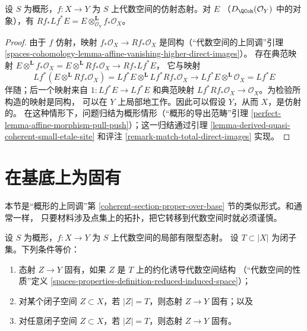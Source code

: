 \begin{lemma}
\label{lemma-affine-morphism-pull-push}
设 $S$ 为概形，$f : X \to Y$ 为 $S$ 上代数空间的仿射态射。对 $E$
（$D_\QCoh(\mathcal{O}_Y)$ 中的对象），有
$Rf_* Lf^* E = E \otimes^\mathbf{L}_{\mathcal{O}_Y} f_*\mathcal{O}_X$。
\end{lemma}

\begin{proof}
由于 $f$ 仿射，映射 $f_*\mathcal{O}_X \to Rf_*\mathcal{O}_X$
是同构（“代数空间的上同调”引理
\ref{spaces-cohomology-lemma-affine-vanishing-higher-direct-images}）。
存在典范映射
$E \otimes^\mathbf{L} f_*\mathcal{O}_X =
E \otimes^\mathbf{L} Rf_*\mathcal{O}_X \to Rf_* Lf^* E$，
它与映射
$$
Lf^*(E \otimes^\mathbf{L} Rf_*\mathcal{O}_X) =
Lf^*E \otimes^\mathbf{L} Lf^*Rf_*\mathcal{O}_X \longrightarrow
Lf^* E \otimes^\mathbf{L} \mathcal{O}_X = Lf^* E
$$
伴随；后一个映射来自 $1 : Lf^*E \to Lf^*E$ 和典范映射
$Lf^*Rf_*\mathcal{O}_X \to \mathcal{O}_X$。为检验所构造的映射是同构，
可以在 $Y$ 上局部地工作。因此可以假设 $Y$，从而 $X$，是仿射的。
在这种情形下，问题归结为概形情形（“概形的导出范畴”引理
\ref{perfect-lemma-affine-morphism-pull-push}）；这一归结通过引理
\ref{lemma-derived-quasi-coherent-small-etale-site} 和评注
\ref{remark-match-total-direct-images} 实现。
\end{proof}


\section{在基底上为固有}
\label{section-proper-over-base}

\noindent
本节是“概形的上同调”第
\ref{coherent-section-proper-over-base} 节的类似形式。和通常一样，
只要材料涉及点集上的拓扑，把它转移到代数空间时就必须谨慎。

\begin{lemma}
\label{lemma-closed-proper-over-base}
设 $S$ 为概形，$f : X \to Y$ 为 $S$ 上代数空间的局部有限型态射。
设 $T \subset |X|$ 为闭子集。下列条件等价：
\begin{enumerate}
\item 态射 $Z \to Y$ 固有，如果 $Z$ 是 $T$ 上的约化诱导代数空间结构
（“代数空间的性质”定义
\ref{spaces-properties-definition-reduced-induced-space}）；
\item 对某个闭子空间 $Z \subset X$，若 $|Z| = T$，则态射
$Z \to Y$ 固有；以及
\item 对任意闭子空间 $Z \subset X$，若 $|Z| = T$，则态射
$Z \to Y$ 固有。
\end{enumerate}
\end{lemma}

